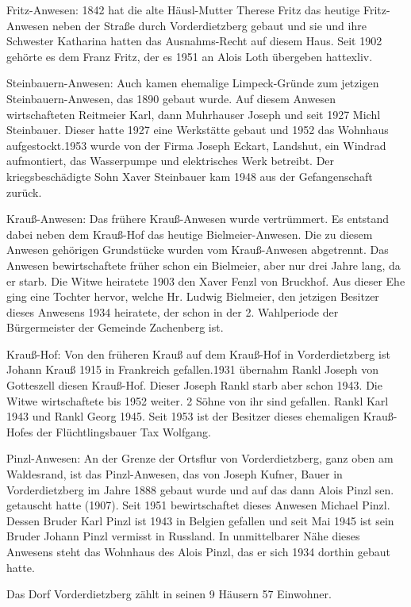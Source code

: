 \documentclass{book}
\begin{document}
Fritz-Anwesen: 1842 hat die alte Häusl-Mutter Therese Fritz das heutige
Fritz-Anwesen neben der Straße durch Vorderdietzberg gebaut und sie und ihre
Schwester Katharina hatten das Ausnahms-Recht auf diesem Haus. Seit 1902 gehörte
es dem Franz Fritz, der es 1951 an Alois Loth übergeben hattexliv.

Steinbauern-Anwesen: Auch kamen ehemalige Limpeck-Gründe zum jetzigen
Steinbauern-Anwesen, das 1890 gebaut wurde. Auf diesem Anwesen wirtschafteten
Reitmeier Karl, dann Muhrhauser Joseph und seit 1927 Michl Steinbauer. Dieser
hatte 1927 eine Werkstätte gebaut und 1952 das Wohnhaus aufgestockt.1953 wurde
von der Firma Joseph Eckart, Landshut, ein Windrad aufmontiert, das Wasserpumpe
und elektrisches Werk betreibt. Der kriegsbeschädigte Sohn Xaver Steinbauer kam
1948 aus der Gefangenschaft zurück.

Krauß-Anwesen: Das frühere Krauß-Anwesen wurde vertrümmert. Es entstand dabei
neben dem Krauß-Hof das heutige Bielmeier-Anwesen. Die zu diesem Anwesen
gehörigen Grundstücke wurden vom Krauß-Anwesen abgetrennt. Das Anwesen
bewirtschaftete früher schon ein Bielmeier, aber nur drei Jahre lang, da er
starb. Die Witwe heiratete 1903 den Xaver Fenzl von Bruckhof. Aus dieser Ehe
ging eine Tochter hervor, welche Hr. Ludwig Bielmeier, den jetzigen Besitzer
dieses Anwesens 1934 heiratete, der schon in der 2. Wahlperiode der
Bürgermeister der Gemeinde Zachenberg ist.

Krauß-Hof: Von den früheren Krauß auf dem Krauß-Hof in Vorderdietzberg ist
Johann Krauß 1915 in Frankreich gefallen.1931 übernahm Rankl Joseph von
Gotteszell diesen Krauß-Hof. Dieser Joseph Rankl starb aber schon 1943. Die
Witwe wirtschaftete bis 1952 weiter. 2 Söhne von ihr sind gefallen. Rankl Karl
1943 und Rankl Georg 1945. Seit 1953 ist der Besitzer dieses ehemaligen
Krauß-Hofes der Flüchtlingsbauer Tax Wolfgang.

Pinzl-Anwesen: An der Grenze der Ortsflur von Vorderdietzberg, ganz oben am
Waldesrand, ist das Pinzl-Anwesen, das von Joseph Kufner, Bauer in
Vorderdietzberg im Jahre 1888 gebaut wurde und auf das dann Alois Pinzl sen.
getauscht hatte (1907). Seit 1951 bewirtschaftet dieses Anwesen Michael Pinzl.
Dessen Bruder Karl Pinzl ist 1943 in Belgien gefallen und seit Mai 1945 ist sein
Bruder Johann Pinzl vermisst in Russland. In unmittelbarer Nähe dieses Anwesens
steht das Wohnhaus des Alois Pinzl, das er sich 1934 dorthin gebaut hatte.

Das Dorf Vorderdietzberg zählt in seinen 9 Häusern 57 Einwohner.
\end{document}
